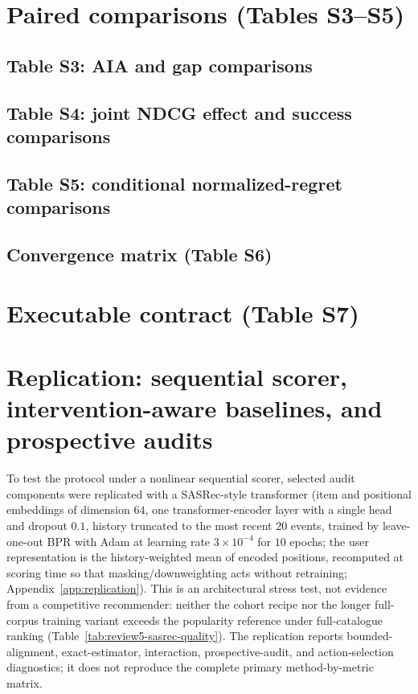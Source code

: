 \documentclass[a4paper,fleqn,doubleblind]{cas-sc}
\begin{document}
\section{Paired comparisons (Tables S3--S5)}
\begin{landscape}
\subsection*{Table S3: AIA and gap comparisons}

\subsection*{Table S4: joint NDCG effect and success comparisons}

\subsection*{Table S5: conditional normalized-regret comparisons}

\end{landscape}
\clearpage
\begin{landscape}
\section{Convergence matrix (Table S6)}

\end{landscape}
\clearpage
\section{Executable contract (Table S7)}


\clearpage
\section{Replication: sequential scorer, intervention-aware baselines, and prospective audits}\label{app:replication-sec}\label{app:replication}
To test the protocol under a nonlinear sequential scorer, selected audit components were replicated with a SASRec-style transformer (item and positional embeddings of dimension $64$, one transformer-encoder layer with a single head and dropout $0.1$, history truncated to the most recent $20$ events, trained by leave-one-out BPR with Adam at learning rate $3\times10^{-4}$ for $10$ epochs; the user representation is the history-weighted mean of encoded positions, recomputed at scoring time so that masking/downweighting acts without retraining; Appendix~\ref{app:replication}). This is an architectural stress test, not evidence from a competitive recommender: neither the cohort recipe nor the longer full-corpus training variant exceeds the popularity reference under full-catalogue ranking (Table~\ref{tab:review5-sasrec-quality}). The replication reports bounded-alignment, exact-estimator, interaction, prospective-audit, and action-selection diagnostics; it does not reproduce the complete primary method-by-metric matrix.
\end{document}
